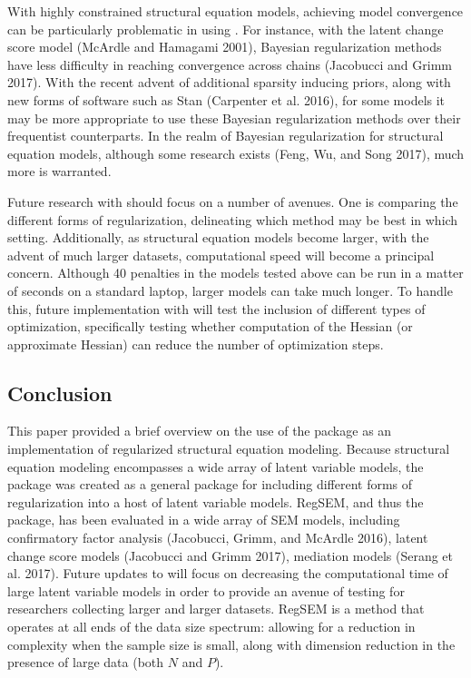 \documentclass[article]{jss}
\begin{document}
With highly constrained structural equation models, achieving model
convergence can be particularly problematic in using . For
instance, with the latent change score model (McArdle and Hamagami
2001), Bayesian regularization methods have less difficulty in reaching
convergence across chains (Jacobucci and Grimm 2017). With the recent
advent of additional sparsity inducing priors, along with new forms of
software such as Stan (Carpenter et al. 2016), for some models it may be
more appropriate to use these Bayesian regularization methods over their
frequentist counterparts. In the realm of Bayesian regularization for
structural equation models, although some research exists (Feng, Wu, and
Song 2017), much more is warranted.

Future research with  should focus on a number of avenues.
One is comparing the different forms of regularization, delineating
which method may be best in which setting. Additionally, as structural
equation models become larger, with the advent of much larger datasets,
computational speed will become a principal concern. Although 40
penalties in the models tested above can be run in a matter of seconds
on a standard laptop, larger models can take much longer. To handle
this, future implementation with  will test the inclusion of
different types of optimization, specifically testing whether
computation of the Hessian (or approximate Hessian) can reduce the
number of optimization steps.

\subsection{Conclusion}\label{conclusion}

This paper provided a brief overview on the use of the 
package as an implementation of regularized structural equation
modeling. Because structural equation modeling encompasses a wide array
of latent variable models, the  package was created as a
general package for including different forms of regularization into a
host of latent variable models. RegSEM, and thus the 
package, has been evaluated in a wide array of SEM models, including
confirmatory factor analysis (Jacobucci, Grimm, and McArdle 2016),
latent change score models (Jacobucci and Grimm 2017), mediation models
(Serang et al. 2017). Future updates to  will focus on
decreasing the computational time of large latent variable models in
order to provide an avenue of testing for researchers collecting larger
and larger datasets. RegSEM is a method that operates at all ends of the
data size spectrum: allowing for a reduction in complexity when the
sample size is small, along with dimension reduction in the presence of
large data (both \(N\) and \(P\)).
\end{document}
